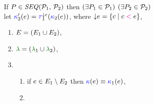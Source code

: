 \begin{figure}
  \noindent
  If $\aPS \in \sSEMI{\aPSS_1}{\aPSS_2}$ then $(\exists P_1\in\mathcal{P}_1)$ $(\exists P_2\in\mathcal{P}_2)$\\
  let
  $\labelingForm'_2(\aEv)=\aTr[1]{\Cdown{\aEv}}{\labelingForm_2(\aEv})$, where
  $\smash{\downarrow}e=\{ c \mid c \mathrel{{\color{magenta}<}} e \}$,
  \begin{multicols}{2}
    \begin{enumerate}[topsep=0pt,label=(\textsc{s}\arabic*),ref=\textsc{s}\arabic*]
    \item \label{seq-E}
      $E = (E_1\cup E_2)$,
    \item \label{seq-lambda}
      ${\labeling}=\PBR{{\labeling_1}\cup {\labeling_2}}$, 
    \item[] 
      \begin{enumerate}[leftmargin=0pt]
      \item \label{seq-kappa1}
        if $e\in E_1\setminus E_2$ then ${\color{blue}\kappa}(e) \mathrel{\equiv} {\color{blue}\kappa}_1(e)$,
      \item \label{seq-kappa2}

\end{enumerate}
\end{enumerate}
\end{multicols}
\end{figure}
